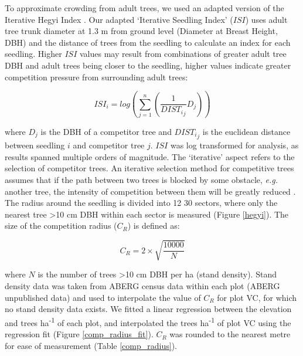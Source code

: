 \documentclass[a4paper, 11pt]{article}
\newcommand{\textapprox}{\raisebox{0.5ex}{\texttildelow}}
\begin{document}
To approximate crowding from adult trees, we used an adapted version of the Iterative Hegyi Index \citep{Hegyi1974, Lee2004, Seifert2014}. Our adapted `Iterative Seedling Index' ($ISI$) uses adult tree trunk diameter at \textapprox{}1.3 m from ground level (Diameter at Breast Height, DBH) and the distance of trees from the seedling to calculate an index for each seedling. Higher $ISI$ values may result from combinations of  greater adult tree DBH and adult trees being closer to the seedling, higher values indicate greater competition pressure from surrounding adult trees:

\begin{equation}
\label{eq:ISI}
ISI_i = log(\sum_{j=1}^n (\frac{1}{{DIST_i}_j} D_j))
\end{equation}

where $D_j$ is the DBH of a competitor tree and ${{DIST_i}_j}$ is the euclidean distance between seedling $i$ and competitor tree $j$. $ISI$ was log transformed for analysis, as results spanned multiple orders of magnitude. The `iterative' aspect refers to the selection of competitor trees. An iterative selection method for competitive trees assumes that if the path between two trees is blocked by some obstacle, \textit{e.g.} another tree, the intensity of competition between them will be greatly reduced \citep{Gadow1999}. The radius around the seedling is divided into 12 30\textdegree{} sectors, where only the nearest tree \textgreater{}10 cm DBH within each sector is measured (Figure \ref{hegyi}). The size of the competition radius ($C_R$) is defined as:

\begin{equation}
\label{eq:CR}
C_R = 2 \times \sqrt{\frac{10000}{N}}
\end{equation}

where $N$ is the number of trees \textgreater10 cm DBH per ha (stand density). Stand density data was taken from ABERG census data within each plot (ABERG unpublished data) and used to interpolate the value of $C_R$ for plot VC, for which no stand density data exists. We fitted a linear regression between the elevation and trees ha\textsuperscript{-1} of each plot, and interpolated the trees ha\textsuperscript{-1} of plot VC using the regression fit (Figure \ref{comp_radius_fit}). $C_R$ was rounded to the nearest metre for ease of measurement (Table \ref{comp_radius}). 
\end{document}
